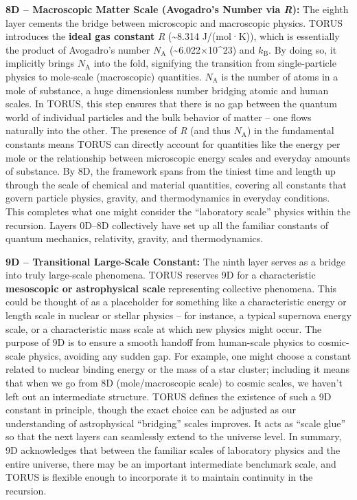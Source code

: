 \documentclass[]{article}
\newcommand{\subscript}[1]{\ensuremath{_{\mathrm{#1}}}}
\begin{document}
\textbf{8D -- Macroscopic Matter Scale (Avogadro's Number via
\emph{R}):} The eighth layer cements the bridge between microscopic and
macroscopic physics. TORUS introduces the \textbf{ideal gas constant}
\emph{R} (\textasciitilde{}8.314 J/(mol·K)), which is essentially the
product of Avogadro's number
$N\subscript{A}$ (\textasciitilde{}6.022×10\^{}23) and
$k\subscript{B}$. By doing
so, it implicitly brings
$N\subscript{A}$ into
the fold, signifying the transition from single-particle physics to
mole-scale (macroscopic) quantities.
$N\subscript{A}$ is
the number of atoms in a mole of substance, a huge dimensionless number
bridging atomic and human scales. In TORUS, this step ensures that there
is no gap between the quantum world of individual particles and the bulk
behavior of matter -- one flows naturally into the other. The presence
of \emph{R} (and thus
$N\subscript{A}$) in
the fundamental constants means TORUS can directly account for
quantities like the energy per mole or the relationship between
microscopic energy scales and everyday amounts of substance. By 8D, the
framework spans from the tiniest time and length up through the scale of
chemical and material quantities, covering all constants that govern
particle physics, gravity, and thermodynamics in everyday conditions.
This completes what one might consider the ``laboratory scale'' physics
within the recursion. Layers 0D--8D collectively have set up all the
familiar constants of quantum mechanics, relativity, gravity, and
thermodynamics.

\textbf{9D -- Transitional Large-Scale Constant:} The ninth layer serves
as a bridge into truly large-scale phenomena. TORUS reserves 9D for a
characteristic \textbf{mesoscopic or astrophysical scale} representing
collective phenomena. This could be thought of as a placeholder for
something like a characteristic energy or length scale in nuclear or
stellar physics -- for instance, a typical supernova energy scale, or a
characteristic mass scale at which new physics might occur. The purpose
of 9D is to ensure a smooth handoff from human-scale physics to
cosmic-scale physics, avoiding any sudden gap. For example, one might
choose a constant related to nuclear binding energy or the mass of a
star cluster; including it means that when we go from 8D
(mole/macroscopic scale) to cosmic scales, we haven't left out an
intermediate structure. TORUS defines the existence of such a 9D
constant in principle, though the exact choice can be adjusted as our
understanding of astrophysical ``bridging'' scales improves. It acts as
``scale glue'' so that the next layers can seamlessly extend to the
universe level. In summary, 9D acknowledges that between the familiar
scales of laboratory physics and the entire universe, there may be an
important intermediate benchmark scale, and TORUS is flexible enough to
incorporate it to maintain continuity in the recursion.
\end{document}
